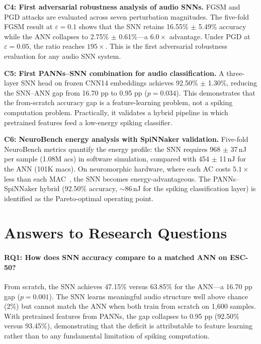 \textbf{C4: First adversarial robustness analysis of audio SNNs.}
FGSM and PGD attacks are evaluated across seven perturbation magnitudes. The five-fold FGSM result at $\varepsilon = 0.1$ shows that the SNN retains 16.55\% $\pm$ 5.49\% accuracy while the ANN collapses to 2.75\% $\pm$ 0.61\%---a $6.0\times$ advantage. Under PGD at $\varepsilon = 0.05$, the ratio reaches $195\times$. This is the first adversarial robustness evaluation for any audio SNN system.

\textbf{C5: First PANNs--SNN combination for audio classification.}
A three-layer SNN head on frozen CNN14 embeddings achieves 92.50\% $\pm$ 1.30\%, reducing the SNN--ANN gap from 16.70 pp to 0.95 pp ($p = 0.034$). This demonstrates that the from-scratch accuracy gap is a feature-learning problem, not a spiking computation problem. Practically, it validates a hybrid pipeline in which pretrained features feed a low-energy spiking classifier.

\textbf{C6: NeuroBench energy analysis with SpiNNaker validation.}
Five-fold NeuroBench metrics quantify the energy profile: the SNN requires 968 $\pm$ 37\,nJ per sample (1.08M \glspl{ac}) in software simulation, compared with 454 $\pm$ 11\,nJ for the ANN (101K \glspl{mac}). On neuromorphic hardware, where each AC costs $5.1\times$ less than each MAC~\citep{horowitz2014energy}, the SNN becomes energy-advantageous. The PANNs--SpiNNaker hybrid (92.50\% accuracy, $\sim$86\,nJ for the spiking classification layer) is identified as the Pareto-optimal operating point.

\section{Answers to Research Questions}
\label{sec:rq-answers}

\paragraph{RQ1: How does SNN accuracy compare to a matched ANN on ESC-50?}
From scratch, the SNN achieves 47.15\% versus 63.85\% for the ANN---a 16.70 pp gap ($p = 0.001$). The SNN learns meaningful audio structure well above chance (2\%) but cannot match the ANN when both train from scratch on 1,600 samples. With pretrained features from PANNs, the gap collapses to 0.95 pp (92.50\% versus 93.45\%), demonstrating that the deficit is attributable to feature learning rather than to any fundamental limitation of spiking computation.

